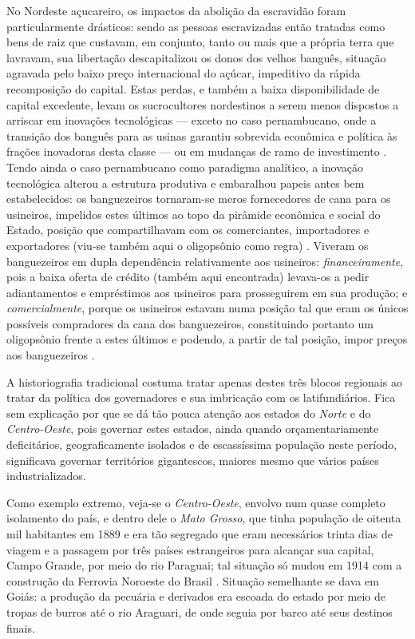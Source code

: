 No Nordeste açucareiro, os impactos da abolição da escravidão foram particularmente drásticos: sendo as pessoas escravizadas então tratadas como bens de raiz que custavam, em conjunto, tanto ou mais que a própria terra que lavravam, sua libertação descapitalizou os donos dos velhos banguês, situação agravada pelo baixo preço internacional do açúcar, impeditivo da rápida recomposição do capital. Estas perdas, e também a baixa disponibilidade de capital excedente, levam os sucrocultores nordestinos a serem menos dispostos a arriscar em inovações tecnológicas --- exceto no caso pernambucano, onde a transição dos banguês para as usinas garantiu sobrevida econômica e política às frações inovadoras desta classe --- ou em mudanças de ramo de investimento \cite[p.~153]{CARONE1970inst}.   Tendo ainda o caso pernambucano como paradigma analítico, a inovação tecnológica alterou a estrutura produtiva e embaralhou papeis antes bem estabelecidos: os banguezeiros tornaram-se meros fornecedores de cana para os usineiros, impelidos estes últimos ao topo da pirâmide econômica e social do Estado, posição que compartilhavam com os comerciantes, importadores e exportadores (viu-se também aqui o oligopsônio como regra) \cite[p.~228]{perissinotto_cladom_1994}. Viveram os banguezeiros em dupla dependência relativamente aos usineiros: \textit{financeiramente}, pois a baixa oferta de crédito (também aqui encontrada) levava-os a pedir adiantamentos e empréstimos aos usineiros para prosseguirem em sua produção; e \textit{comercialmente}, porque os usineiros estavam numa posição tal que eram os únicos possíveis compradores da cana dos banguezeiros, constituindo portanto um oligopsônio frente a estes últimos e podendo, a partir de tal posição, impor preços aos banguezeiros \cite[pp.~228-229]{perissinotto_cladom_1994}.

A historiografia tradicional costuma tratar apenas destes três blocos regionais ao tratar da política dos governadores e sua imbricação com os latifundiários. Fica sem explicação por que se dá tão pouca atenção aos estados do \textit{Norte} e do \textit{Centro-Oeste}, pois governar estes estados, ainda quando orçamentariamente deficitários, geograficamente isolados e de escassíssima população neste período, significava governar territórios gigantescos, maiores mesmo que vários países industrializados. 

Como exemplo extremo, veja-se o \textit{Centro-Oeste}, envolvo num quase completo isolamento do país, e dentro dele o \textit{Mato Grosso}, que tinha população de oitenta mil habitantes em 1889 e era tão segregado que eram necessários trinta dias de viagem e a passagem por três países estrangeiros para alcançar sua capital, Campo Grande, por meio do rio Paraguai; tal situação só mudou em 1914 com a construção da Ferrovia Noroeste do Brasil \cite{almeida_matogrosso_2011}. Situação semelhante se dava em Goiás: a produção da pecuária e derivados era escoada do estado por meio de tropas de burros até o rio Araguari, de onde seguia por barco até seus destinos finais.

